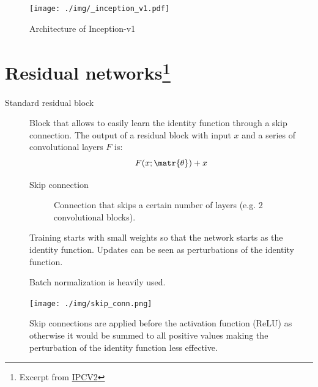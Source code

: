 \begin{figure}[H]
    \centering
    \texttt{[image: ./img/\_inception\_v1.pdf]}
    \caption{Architecture of Inception-v1}
\end{figure}



\section{Residual networks\protect\footnote{Excerpt from \href{https://raw.githubusercontent.com/NotXia/unibo-ai-notes/pdfs/year1/image-processing-and-computer-vision/module2/ipcv2.pdf}{IPCV2}}}

\begin{description}
    \item[Standard residual block] 
        Block that allows to easily learn the identity function through a skip connection.
        The output of a residual block with input $x$ and a series of convolutional layers $F$ is:
        \[ F(x; \matr{\theta}) + x \]

        \begin{minipage}{0.75\linewidth}
            \begin{description}
                \item[Skip connection] 
                    Connection that skips a certain number of layers (e.g. 2 convolutional blocks).
            \end{description}
    
            \begin{remark}
                Training starts with small weights so that the network starts as the identity function. Updates can be seen as perturbations of the identity function.
            \end{remark}
    
            \begin{remark}
                Batch normalization is heavily used.
            \end{remark}
        \end{minipage}
        \begin{minipage}{0.2\linewidth}
            \centering
            \texttt{[image: ./img/skip\_conn.png]}
        \end{minipage}
        
        \begin{remark}
            Skip connections are applied before the activation function (ReLU) as otherwise it would be summed to all positive values making the perturbation of the identity function less effective.
        \end{remark}
\end{description}


